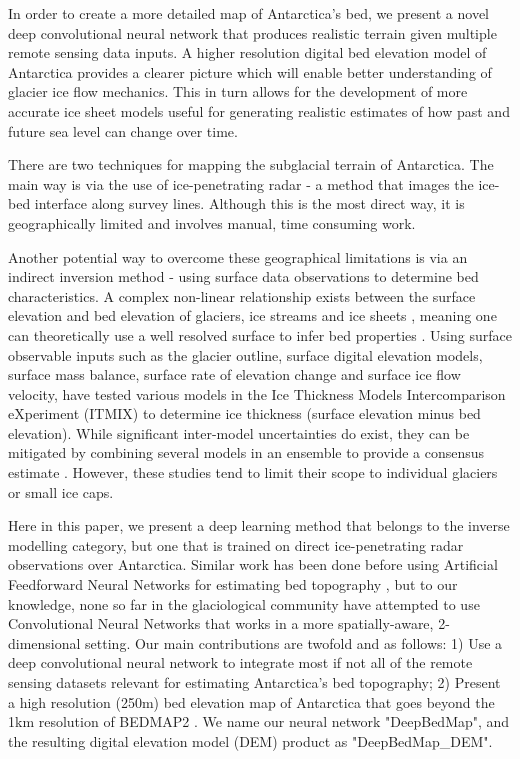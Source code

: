 \documentclass[tc, manuscript]{copernicus}
\begin{document}


\introduction  %

In order to create a more detailed map of Antarctica's bed, we present a novel deep convolutional neural network that produces realistic terrain given multiple remote sensing data inputs.
A higher resolution digital bed elevation model of Antarctica provides a clearer picture which will enable better understanding of glacier ice flow mechanics.
This in turn allows for the development of more accurate ice sheet models useful for generating realistic estimates of how past and future sea level can change over time.

There are two techniques for mapping the subglacial terrain of Antarctica.
The main way is via the use of ice-penetrating radar - a method that images the ice-bed interface along survey lines.
Although this is the most direct way, it is geographically limited and involves manual, time consuming work.

Another potential way to overcome these geographical limitations is via an indirect inversion method - using surface data observations to determine bed characteristics.
A complex non-linear relationship exists between the surface elevation and bed elevation of glaciers, ice streams and ice sheets \citep{Raymondrelationshipsurfacebasal2005}, meaning one can theoretically use a well resolved surface to infer bed properties \citep[e.g.][]{Farinottimethodestimateice2009}.
Using surface observable inputs such as the glacier outline, surface digital elevation models, surface mass balance, surface rate of elevation change and surface ice flow velocity, \citet{FarinottiHowaccurateare2017} have tested various models in the Ice Thickness Models Intercomparison eXperiment (ITMIX) to determine ice thickness (surface elevation minus bed elevation).
While significant inter-model uncertainties do exist, they can be mitigated by combining several models in an ensemble to provide a consensus estimate \citep{Farinotticonsensusestimateice2019}.
However, these studies tend to limit their scope to individual glaciers or small ice caps.

Here in this paper, we present a deep learning method that belongs to the inverse modelling category, but one that is trained on direct ice-penetrating radar observations over Antarctica.
Similar work has been done before using Artificial Feedforward Neural Networks for estimating bed topography \citep[e.g.][]{ClarkeNeuralNetworksApplied2009,MonnierInferencebedtopography2018}, but to our knowledge, none so far in the glaciological community have attempted to use Convolutional Neural Networks that works in a more spatially-aware, 2-dimensional setting.
Our main contributions are twofold and as follows:
1) Use a deep convolutional neural network to integrate most if not all of the remote sensing datasets relevant for estimating Antarctica's bed topography;
2) Present a high resolution (250m) bed elevation map of Antarctica that goes beyond the 1km resolution of BEDMAP2 \citep{FretwellBedmap2improvedice2013}.
We name our neural network "DeepBedMap", and the resulting digital elevation model (DEM) product as "DeepBedMap\_DEM".
\end{document}
